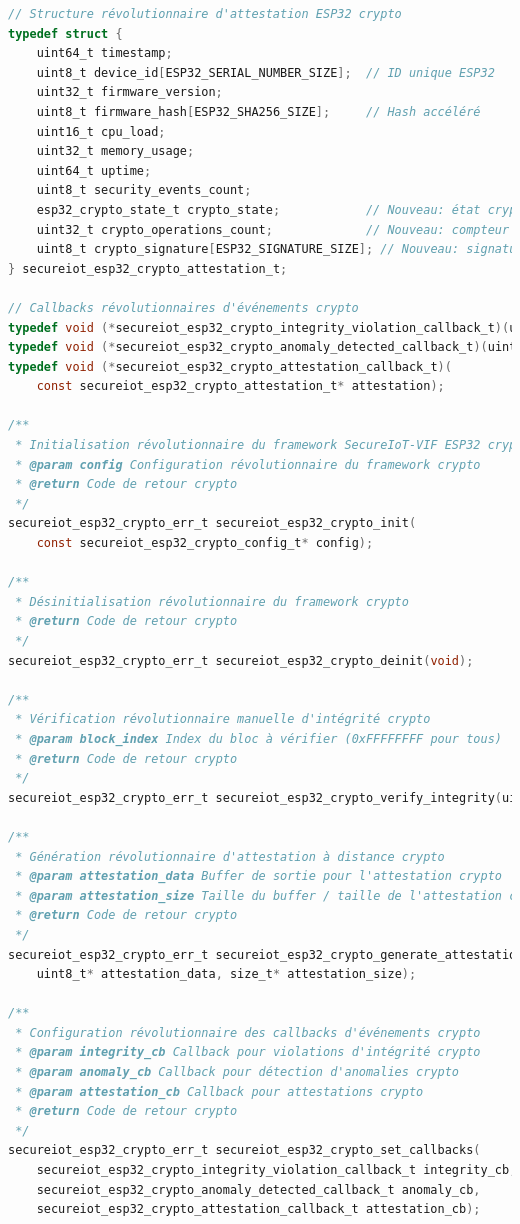 \begin{lstlisting}[language=C, caption={API révolutionnaire publique SecureIoT-VIF ESP32 crypto intégré}]
// Structure révolutionnaire d'attestation ESP32 crypto
typedef struct {
    uint64_t timestamp;
    uint8_t device_id[ESP32_SERIAL_NUMBER_SIZE];  // ID unique ESP32
    uint32_t firmware_version;
    uint8_t firmware_hash[ESP32_SHA256_SIZE];     // Hash accéléré
    uint16_t cpu_load;
    uint32_t memory_usage;
    uint64_t uptime;
    uint8_t security_events_count;
    esp32_crypto_state_t crypto_state;            // Nouveau: état crypto ESP32
    uint32_t crypto_operations_count;             // Nouveau: compteur crypto
    uint8_t crypto_signature[ESP32_SIGNATURE_SIZE]; // Nouveau: signature crypto
} secureiot_esp32_crypto_attestation_t;

// Callbacks révolutionnaires d'événements crypto
typedef void (*secureiot_esp32_crypto_integrity_violation_callback_t)(uint32_t block_index);
typedef void (*secureiot_esp32_crypto_anomaly_detected_callback_t)(uint8_t anomaly_type);
typedef void (*secureiot_esp32_crypto_attestation_callback_t)(
    const secureiot_esp32_crypto_attestation_t* attestation);

/**
 * Initialisation révolutionnaire du framework SecureIoT-VIF ESP32 crypto
 * @param config Configuration révolutionnaire du framework crypto
 * @return Code de retour crypto
 */
secureiot_esp32_crypto_err_t secureiot_esp32_crypto_init(
    const secureiot_esp32_crypto_config_t* config);

/**
 * Désinitialisation révolutionnaire du framework crypto
 * @return Code de retour crypto
 */
secureiot_esp32_crypto_err_t secureiot_esp32_crypto_deinit(void);

/**
 * Vérification révolutionnaire manuelle d'intégrité crypto
 * @param block_index Index du bloc à vérifier (0xFFFFFFFF pour tous)
 * @return Code de retour crypto
 */
secureiot_esp32_crypto_err_t secureiot_esp32_crypto_verify_integrity(uint32_t block_index);

/**
 * Génération révolutionnaire d'attestation à distance crypto
 * @param attestation_data Buffer de sortie pour l'attestation crypto
 * @param attestation_size Taille du buffer / taille de l'attestation crypto générée
 * @return Code de retour crypto
 */
secureiot_esp32_crypto_err_t secureiot_esp32_crypto_generate_attestation(
    uint8_t* attestation_data, size_t* attestation_size);

/**
 * Configuration révolutionnaire des callbacks d'événements crypto
 * @param integrity_cb Callback pour violations d'intégrité crypto
 * @param anomaly_cb Callback pour détection d'anomalies crypto
 * @param attestation_cb Callback pour attestations crypto
 * @return Code de retour crypto
 */
secureiot_esp32_crypto_err_t secureiot_esp32_crypto_set_callbacks(
    secureiot_esp32_crypto_integrity_violation_callback_t integrity_cb,
    secureiot_esp32_crypto_anomaly_detected_callback_t anomaly_cb,
    secureiot_esp32_crypto_attestation_callback_t attestation_cb);


\end{lstlisting}
